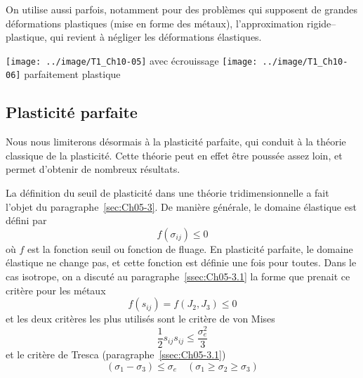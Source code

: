 On utilise aussi parfois, notamment pour des problèmes qui supposent de grandes déformations plastiques (mise en forme des métaux), l'approximation rigide--plastique, qui revient à négliger les déformations élastiques. 
\begin{multicols}{2}
    \centering
    \texttt{[image: ../image/T1\_Ch10-05]}
    avec écrouissage
    \columnbreak
    \texttt{[image: ../image/T1\_Ch10-06]}
    parfaitement plastique
\end{multicols}

\subsection{Plasticité parfaite}
Nous nous limiterons désormais à la plasticité parfaite, qui conduit à la théorie classique de la plasticité.
Cette théorie peut en effet être poussée assez loin, et permet d'obtenir de nombreux résultats. 

La définition du seuil de plasticité dans une théorie tridimensionnelle a fait l'objet du paragraphe~\ref{sec:Ch05-3}.
De manière générale, le domaine élastique est défini par 
\begin{equation}
    f\left( \sigma_{ij} \right) \leq 0
    \label{eq:Ch10-009}
\end{equation}
où $f$ est la fonction seuil ou fonction de fluage.
En plasticité parfaite, le domaine élastique ne change pas, et cette fonction est définie une fois pour toutes.
Dans le cas isotrope, on a discuté au paragraphe~\ref{ssec:Ch05-3.1} la forme que prenait ce critère pour les métaux 
\begin{equation}
    f\left( s_{ij} \right) = f\left( J_2,J_3 \right) \leq 0
    \label{eq:Ch10-010}
\end{equation}
et les deux critères les plus utilisés sont le critère de von Mises 
\begin{equation}
    \frac{1}{2} s_{ij} s_{ij} \leq \frac{\sigma_e^2}{3}
    \label{eq:Ch10-011}
\end{equation}
et le critère de Tresca (paragraphe~\ref{ssec:Ch05-3.1}) 
\begin{equation}
    \left( \sigma_1 - \sigma_3 \right) \leq \sigma_e \quad \left( \sigma_1 \geq \sigma_2 \geq \sigma_3 \right)
    \label{eq:Ch10-012}
\end{equation}

